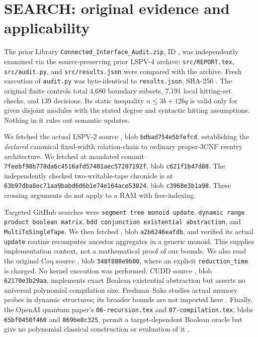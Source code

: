 \documentclass[11pt]{article}
\begin{document}
\section{SEARCH: original evidence and applicability}
The prior Library \texttt{Connected\_Interface\_Audit.zip}, ID , was independently examined via the source-preserving prior LSPV-4 archive; \texttt{src/REPORT.tex}, \texttt{src/audit.py}, and \texttt{src/results.json} were compared with the archive. Fresh execution of \texttt{audit.py} was byte-identical to \texttt{results.json}, SHA-256 . The original finite controls total 4,680 boundary subsets, 7,191 local hitting-set checks, and 139 decisions. Its static inequality $n\le3b+12bq$ is valid only for given disjoint modules with the stated degree and syntactic hitting assumptions. Nothing in it rules out semantic updates.

We fetched the actual LSPV-2 source , blob \texttt{bdbad754e5bfefcd}, establishing the \emph{declared} canonical fixed-width relation-chain to ordinary proper-3CNF reentry architecture. We fetched  at mandated commit \texttt{7feebf98b778da6c4516afd57401aec57207192f}, blob \texttt{c621f1b47d88}. The independently checked two-writable-tape chronicle is  at \texttt{63b97dba8ec71aa9babd6d6b1e74e164ace53024}, blob \texttt{c3968e3b1a98}. These crossing arguments do not apply to a RAM with free-indexing.

Targeted GitHub searches were \texttt{segment tree monoid update}, \texttt{dynamic range product boolean matrix}, \texttt{bdd conjunction existential abstraction}, and \texttt{MultiToSingleTape}. We then fetched , blob \texttt{a2b6246eafdb}, and verified its actual \texttt{update} routine recomputes ancestor aggregates in a generic monoid. This supplies implementation context, not a mathematical proof of our bounds. We also read the original Coq source , blob \texttt{348f880e9b00}, where an explicit \texttt{reduction\_time} is charged. No kernel execution was performed. CUDD source , blob \texttt{62170e3b29aa}, implements exact Boolean existential abstraction but asserts no universal polynomial compilation size. Fredman--Saks studies actual memory probes in dynamic structures; its broader bounds are not imported here \cite{fredmansaks}. Finally, the OpenAI quantum paper's \texttt{06-recursion.tex} and \texttt{07-compilation.tex}, blobs \texttt{65bf0450f460} and \texttt{869be8c325}, permit a target-dependent Boolean oracle but give no polynomial classical construction or evaluation of it \cite{openai}.
\end{document}
